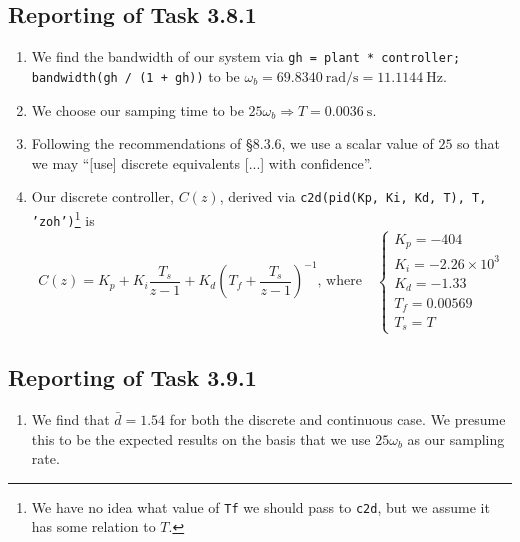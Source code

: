 \documentclass[11pt]{article} %
\begin{document}
\subsection*{Reporting of Task 3.8.1}
\begin{enumerate}
\item We find the bandwidth of our system via \texttt{gh = plant *
    controller; bandwidth(gh / (1 + gh))} to be
  $\omega_b = 69.8340~\text{rad/s} = 11.1144~\text{Hz}$.
\item We choose our samping time to be
  $25\omega_b \Rightarrow T = 0.0036~\text{s}$.
\item Following the recommendations of §8.3.6, we use a scalar value
  of $25$ so that we may ``[use] discrete equivalents [...] with
  confidence''.
\item
  Our discrete controller, $C(z)$, derived via \texttt{c2d(pid(Kp, Ki,
    Kd, T), T, ’zoh’)}\footnote{We have no idea what value of
    \texttt{Tf} we should pass to \texttt{c2d}, but we assume it has
    some relation to $T$.} is
  \begin{equation}
    C(z) =
    K_p
    + K_i\frac{T_s}{z - 1}
    + K_d\left(
      T_f + \frac{T_s}{z - 1}
    \right)^{-1}
    \text{, where}
    \quad
    \begin{cases}
      K_p = -404 \\
      K_i = -2.26 \times 10^{3} \\
      K_d = -1.33 \\
      T_f = 0.00569 \\
      T_s = T
    \end{cases}
  \end{equation}
\end{enumerate}

\subsection*{Reporting of Task 3.9.1}
\begin{enumerate}
\item We find that $\bar{d} = 1.54$ for both the discrete and
  continuous case. We presume this to be the expected results on the
  basis that we use $25\omega_b$ as our sampling rate.
\end{enumerate}
\end{document}
